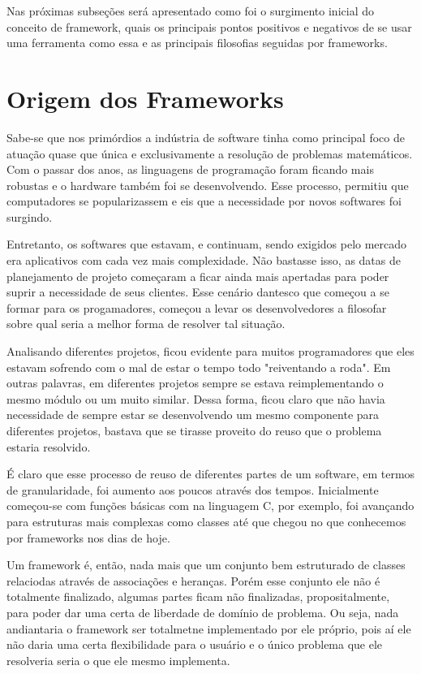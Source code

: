 \documentclass[
    12pt,       %
    openright,      %
    twoside,      %
    a4paper,      %
    english,      %
    french,       %
    spanish,      %
    brazil,       %
    ]{abntex2}
\begin{document}
      Nas próximas subseções será apresentado como foi o surgimento inicial
      do conceito de framework, quais os principais pontos positivos e
      negativos de se usar uma ferramenta como essa e as principais filosofias
      seguidas por frameworks.

      \section{Origem dos Frameworks}
          Sabe-se que nos primórdios a indústria de software tinha como principal
          foco de atuação quase que única e exclusivamente a resolução de problemas
          matemáticos. Com o passar dos anos, as linguagens de programação
          foram ficando mais robustas e o hardware também foi se desenvolvendo. Esse
          processo, permitiu que computadores se popularizassem e eis que a necessidade
          por novos softwares foi surgindo.

          Entretanto, os softwares que estavam, e continuam, sendo exigidos pelo
          mercado era aplicativos com cada vez mais complexidade. Não bastasse isso,
          as datas de planejamento de projeto começaram a ficar ainda mais apertadas
          para poder suprir a necessidade de seus clientes. Esse cenário dantesco
          que começou a se formar para os progamadores, começou a levar os desenvolvedores
          a filosofar sobre qual seria a melhor forma de resolver tal situação.

          Analisando diferentes projetos, ficou evidente para muitos programadores
          que eles estavam sofrendo com o mal de estar o tempo todo "reiventando
          a roda". Em outras palavras, em diferentes projetos sempre se estava
          reimplementando o mesmo módulo ou um muito similar. Dessa forma, ficou
          claro que não havia necessidade de sempre estar se desenvolvendo um mesmo
          componente para diferentes projetos, bastava que se tirasse proveito do reuso
          que o problema estaria resolvido.

          É claro que esse processo de reuso de diferentes partes de um software,
          em termos de granularidade, foi aumento aos poucos através dos tempos.
          Inicialmente começou-se com funções básicas com na linguagem C, por exemplo,
          foi avançando para estruturas mais complexas como classes até que chegou
          no que conhecemos por frameworks nos dias de hoje.

          Um framework é, então, nada mais que um conjunto bem estruturado de classes
          relaciodas através de associações e heranças. Porém esse conjunto ele não
          é totalmente finalizado, algumas partes ficam não finalizadas, propositalmente,
          para poder dar uma certa de liberdade de domínio de problema. Ou seja, nada
          andiantaria o framework ser totalmetne implementado por ele próprio, pois
          aí ele não daria uma certa flexibilidade para o usuário e o único problema
          que ele resolveria seria o que ele mesmo implementa.
\end{document}
